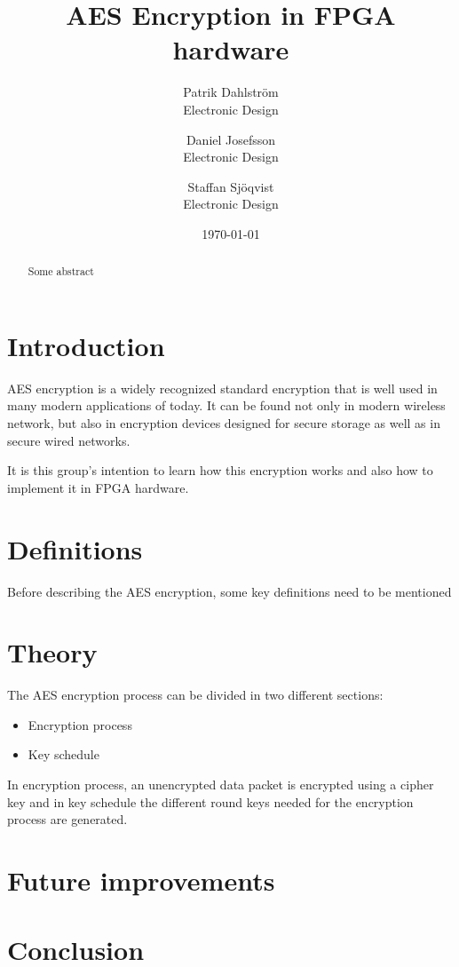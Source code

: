 \documentclass{report}
\title{AES Encryption in FPGA hardware}
\author{
        Patrik Dahlström \\
        Electronic Design\\
            \and
        Daniel Josefsson\\
        Electronic Design\\
            \and
        Staffan Sjöqvist\\
        Electronic Design
}}
\date{\today}
\begin{document}
\maketitle

\begin{abstract}
Some abstract
\end{abstract}

\chapter{Introduction}
AES encryption is a widely recognized standard encryption that is well used in many modern applications of today. It can be found not only in modern wireless network, but also in encryption devices designed for secure storage as well as in secure wired networks.

It is this group's intention to learn how this encryption works and also how to implement it in FPGA hardware.

\chapter{Definitions}
Before describing the AES encryption, some key definitions need to be mentioned



\chapter{Theory}
\label{sec:theory}
The AES encryption process can be divided in two different sections:
\begin{itemize}
\item Encryption process
\item Key schedule
\end{itemize}
In encryption process, an unencrypted data packet is encrypted using a cipher key and in key schedule the different round keys needed for the encryption process are generated.







\chapter{Future improvements}

\chapter{Conclusion}
\end{document}
